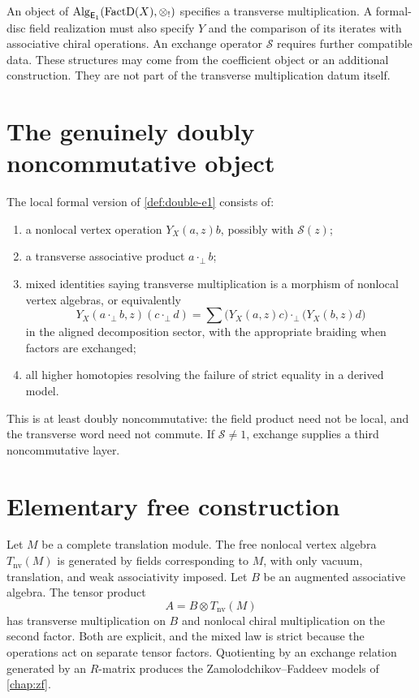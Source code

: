 \begin{remark}
An object of \(\operatorname{Alg}_{\mathsf E_1}(\operatorname{FactD}(X),\mathbin{\otimes_{!}})\) specifies a transverse multiplication.
A formal-disc field realization must also specify \(Y\) and the comparison of its iterates with associative chiral operations.
An exchange operator \(\mathcal S\) requires further compatible data.
These structures may come from the coefficient object or an additional construction.
They are not part of the transverse multiplication datum itself.
\end{remark}

\section{The genuinely doubly noncommutative object}
The local formal version of \cref{def:double-e1} consists of:
\begin{enumerate}
\item a nonlocal vertex operation \(Y_X(a,z)b\), possibly with \(\mathcal S(z)\);
\item a transverse associative product \(a\cdot_\perp b\);
\item mixed identities saying transverse multiplication is a morphism of nonlocal vertex algebras, or equivalently
\[
 Y_X(a\cdot_\perp b,z)(c\cdot_\perp d)
 =\sum \bigl(Y_X(a,z)c\bigr)\cdot_\perp
       \bigl(Y_X(b,z)d\bigr)
\]
in the aligned decomposition sector, with the appropriate braiding when factors are exchanged;
\item all higher homotopies resolving the failure of strict equality in a derived model.
\end{enumerate}
This is at least doubly noncommutative: the field product need not be local, and the transverse word need not commute.  If \(\mathcal S\neq1\), exchange supplies a third noncommutative layer.

\section{Elementary free construction}
Let \(M\) be a complete translation module.  The free nonlocal vertex algebra \(T_{\mathrm{nv}}(M)\) is generated by fields corresponding to \(M\), with only vacuum, translation, and weak associativity imposed.  Let \(B\) be an augmented associative algebra.  The tensor product
\[
 A=B\otimes T_{\mathrm{nv}}(M)
\]
has transverse multiplication on \(B\) and nonlocal chiral multiplication on the second factor.  Both are explicit, and the mixed law is strict because the operations act on separate tensor factors.  Quotienting by an exchange relation generated by an \(R\)-matrix produces the Zamolodchikov--Faddeev models of \cref{chap:zf}.

